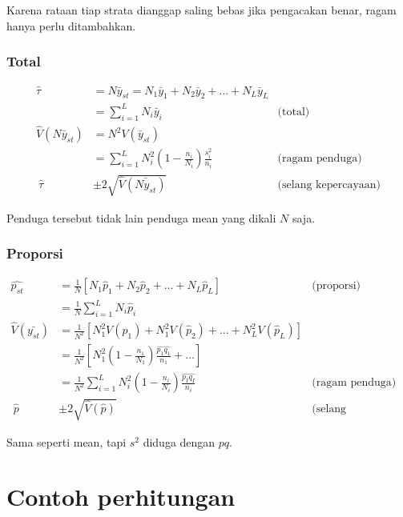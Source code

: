 \documentclass[
  letterpaper,
  DIV=11,
  numbers=noendperiod]{scrreprt}
\begin{document}
Karena rataan tiap strata dianggap saling bebas jika pengacakan benar,
ragam hanya perlu ditambahkan.

\hypertarget{total-3}{%
\subsubsection{Total}\label{total-3}}

\[
\begin{aligned}
\hat{\tau}&=N\bar{y}_{st}=N_1\bar{y}_1+N_2\bar{y}_2+\ldots+N_L\bar{y}_L&\\
&= \sum_{i=1}^L N_i\bar{y}_i &  \text{(total)}\\
\hat{V}(N\bar{y}_{st})&=N^2V(\bar{y}_{st})\\ 
&=\sum_{i=1}^L N_i^2\left(1-\frac{n_i}{N_i}\right)\frac{s_i^2}{n_i}&\text{(ragam penduga)}\\\
\hat{\tau}&\pm2\sqrt{\hat{V}(\bar{Ny_{st}})} & \text{(selang kepercayaan)}
\end{aligned}
\]

Penduga tersebut tidak lain penduga mean yang dikali \(N\) saja.

\hypertarget{proporsi-3}{%
\subsubsection{Proporsi}\label{proporsi-3}}

\[
\begin{aligned}
\hat{p_{st}}&=\frac{1}{N}[N_1\hat{p}_1+N_2\hat{p}_2+\ldots+N_L\hat{p}_L]& \text{(proporsi)}\\
&= \frac{1}{N}\sum_{i=1}^L N_i\hat{p}_i\\
\hat{V}(\bar{y_{st}})&=\frac{1}{N^2}\left[N_1^2 V(\hat{p}_1)+N_1^2 V(\hat{p}_2)+\ldots+N_L^2 V(\hat{p}_L)\right]\\
&=\frac{1}{N^2}\left[N_1^2\left(1-\frac{n_1}{N_1}\right)\frac{\hat{p_1}\hat{q_1}}{n_1}+\ldots\right]\\
 &=\frac{1}{N^2}\sum_{i=1}^L N_i^2\left(1-\frac{n_i}{N_i}\right)\frac{\hat{p_I}\hat{q_I}}{n_i}&\text{(ragam penduga)}\\\
\hat{p}&\pm2\sqrt{\hat{V}(\hat{p})} & \text{(selang kepercayaan)}
\end{aligned}
\]

Sama seperti mean, tapi \(s^2\) diduga dengan \(pq\).

\hypertarget{contoh-perhitungan}{%
\section{Contoh perhitungan}\label{contoh-perhitungan}}
\end{document}
